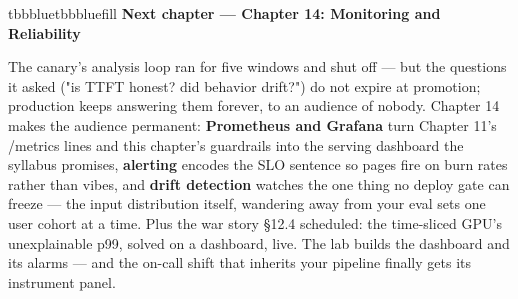 \begin{calloutbox}{tbbblue}{tbbbluefill}
{\normalsize\bfseries\color{tbbblue}Next chapter — Chapter 14: Monitoring and Reliability}\par\vspace{3pt}
The canary's analysis loop ran for five windows and shut off — but the questions it asked ("is TTFT honest? did behavior drift?") do not expire at promotion; production keeps answering them forever, to an audience of nobody. Chapter 14 makes the audience permanent: \textbf{Prometheus and Grafana} turn Chapter 11's /metrics lines and this chapter's guardrails into the serving dashboard the syllabus promises, \textbf{alerting} encodes the SLO sentence so pages fire on burn rates rather than vibes, and \textbf{drift detection} watches the one thing no deploy gate can freeze — the input distribution itself, wandering away from your eval sets one user cohort at a time. Plus the war story §12.4 scheduled: the time-sliced GPU's unexplainable p99, solved on a dashboard, live. The lab builds the dashboard and its alarms — and the on-call shift that inherits your pipeline finally gets its instrument panel.
\end{calloutbox}
